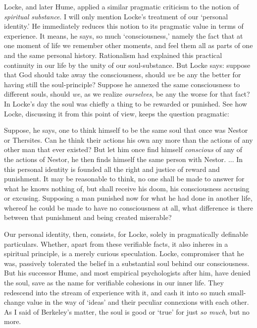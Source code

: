 \documentclass[]{article}
\begin{document}
Locke, and later Hume, applied a similar pragmatic criticism to the notion of \emph{spiritual substance}. I will only mention Locke's treatment of our `personal identity.' He immediately reduces this notion to its pragmatic value in terms of experience. It means, he says, so much `consciousness,' namely the fact that at one moment of life we remember other moments, and feel them all as parts of one and the same personal history. Rationalism had explained this practical continuity in our life by the unity of our soul-substance. But Locke says: suppose that God should take away the consciousness, should \emph{we} be any the better for having still the soul-principle? Suppose he annexed the same consciousness to different souls, should \emph{we}, as we realize \emph{ourselves}, be any the worse for that fact? In Locke's day the soul was chiefly a thing to be rewarded or punished. See how Locke, discussing it from this point of view, keeps the question pragmatic:

Suppose, he says, one to think himself to be the same soul that once was Nestor or Thersites. Can he think their actions his own any more than the actions of any other man that ever existed? But let him once find himself \emph{conscious} of any of the actions of Nestor, he then finds himself the same person with Nestor. ... In this personal identity is founded all the right and justice of reward and punishment. It may be reasonable to think, no one shall be made to answer for what he knows nothing of, but shall receive his doom, his consciousness accusing or excusing. Supposing a man punished now for what he had done in another life, whereof he could be made to have no consciousness at all, what difference is there between that punishment and being created miserable?

Our personal identity, then, consists, for Locke, solely in pragmatically definable particulars. Whether, apart from these verifiable facts, it also inheres in a spiritual principle, is a merely curious speculation. Locke, compromiser that he was, passively tolerated the belief in a substantial soul behind our consciousness. But his successor Hume, and most empirical psychologists after him, have denied the soul, save as the name for verifiable cohesions in our inner life. They redescend into the stream of experience with it, and cash it into so much small-change value in the way of `ideas' and their peculiar connexions with each other. As I said of Berkeley's matter, the soul is good or `true' for just \emph{so much}, but no more.
\end{document}
